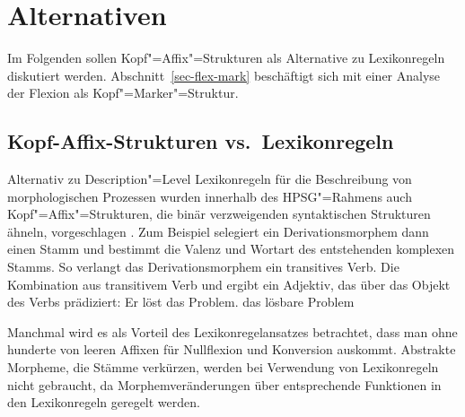 \section{Alternativen}

Im Folgenden sollen Kopf"=Affix"=Strukturen als Alternative zu Lexikonregeln diskutiert werden.
Abschnitt~\ref{sec-flex-mark} beschäftigt sich mit einer Analyse der Flexion als Kopf"=Marker"=Struktur.

\subsection{Kopf-Affix-Strukturen vs.\ Lexikonregeln}
\label{morphem-vs-lr}

Alternativ zu Description"=Level Lexikonregeln für die Beschreibung von morphologischen Prozessen
\parencites{Orgun96a}{Riehemann98a}{AW98a}{Koenig99a}[Abschnitt~6.2.5]{Mueller2002b}{Crysmann2002a} wurden innerhalb des HPSG"=Rahmens
auch Kopf"=Affix"=Strukturen, die binär verzweigenden syntaktischen Strukturen ähneln, vorgeschlagen 
\parencites{KN93a}{Krieger94a}{Eynde94}{Lebeth94}.
Zum Beispiel selegiert ein Derivationsmorphem dann einen Stamm und bestimmt die Valenz und Wortart
des entstehenden komplexen Stamms. So verlangt das Derivationsmorphem  ein transitives
Verb. Die Kombination aus transitivem Verb und  ergibt ein Adjektiv, das über
das Objekt des Verbs prädiziert:
\eal
\ex Er löst das Problem.
\ex das lösbare Problem
\zl


\noindent
Manchmal wird es als Vorteil des Lexikonregelansatzes betrachtet, dass man ohne hunderte von leeren
Affixen für Nullflexion und Konversion auskommt. Abstrakte Morpheme, die Stämme verkürzen, werden bei Verwendung
von Lexikonregeln nicht gebraucht, da Morphemveränderungen über entsprechende Funktionen in den Lexikonregeln
geregelt werden. 

